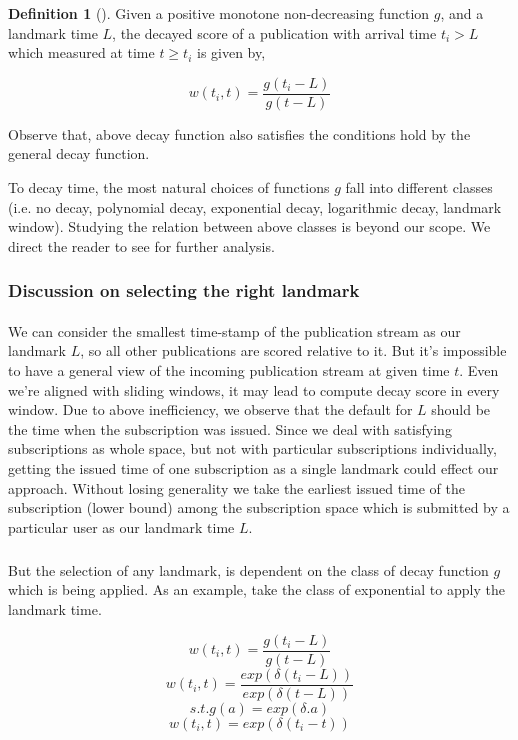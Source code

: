 \documentclass[a4paper,12pt,oneside]{book}
\theoremstyle{definition}
\newtheorem{definition}{Definition}[section]
\theoremstyle{remark}
\begin{document}
\begin{definition}[\label{def:fdecay}]
Given a positive monotone non-decreasing function $g$, and a landmark time $L$, the decayed score of a publication with arrival time $t_i > L$ which  measured at time $t \geq t_i$ is given by,
\begin{center}
\[ w(t_i, t)=\frac{g(t_i-L)}{g(t-L)} \]
\end{center}
Observe that, above decay function also satisfies the conditions hold by the general decay function.
\end{definition}

To decay time, the most natural choices of functions $g$ fall into different classes (i.e. no decay, polynomial decay, exponential decay, logarithmic decay, landmark window). Studying the relation between above classes is beyond our scope. We direct the reader to see \cite{Cormode2009} for further analysis.

\subsubsection{Discussion on selecting the right landmark}
\paragraph*{}
We can consider the smallest time-stamp of the publication stream as our landmark $L$, so all other publications are scored relative to it. But it's impossible to have a general view of the incoming publication stream at given time $t$. Even we're aligned with sliding windows, it may lead to compute decay score in every window. Due to above inefficiency, we observe that the default for $L$ should be the time when the subscription was issued. Since we deal with satisfying subscriptions as whole space, but not with particular subscriptions individually, getting the issued time of one subscription as a single landmark could effect our approach. Without losing generality we take the earliest issued time of the subscription (lower bound) among the subscription space which is submitted by a particular user as our landmark time $L$. 
\subparagraph*{}
But the selection of any landmark, is dependent on the class of decay function $g$ which is being applied. As an example, take the class of exponential to apply the landmark time.

\begin{center}
\[ w(t_i, t)=\frac{g(t_i-L)}{g(t-L)} \]
\[ w(t_i, t)=\frac{exp( \delta (t_i-L))}{exp( \delta (t-L))}\]
\[  s.t. g(a)=exp(\delta.a)  \]
\[ w(t_i, t)= exp( \delta (t_i-t)) \]
\end{center}
\end{document}
